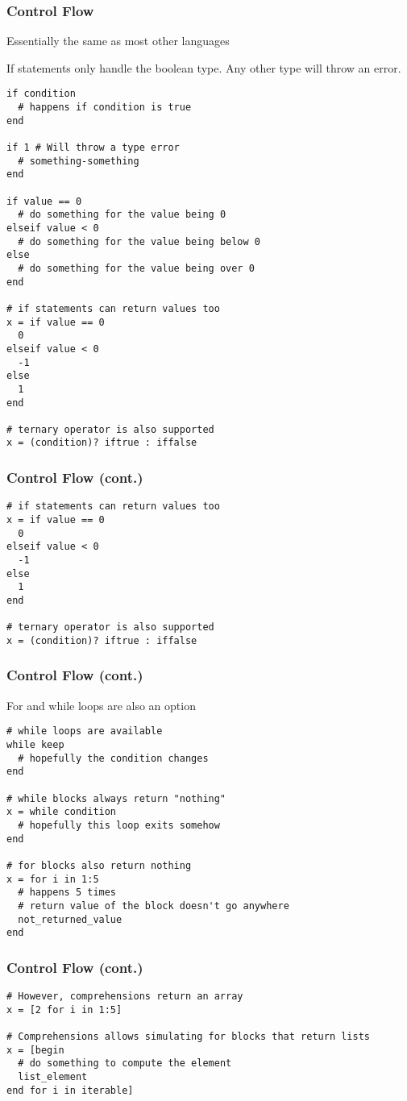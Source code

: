 \documentclass{beamer}
\begin{document}
\begin{frame}[fragile]
\frametitle{Control Flow}
Essentially the same as most other languages

If statements only handle the boolean type. Any other type will throw an error.
\begin{verbatim}
if condition
  # happens if condition is true
end

if 1 # Will throw a type error
  # something-something
end

if value == 0
  # do something for the value being 0
elseif value < 0
  # do something for the value being below 0
else
  # do something for the value being over 0
end

# if statements can return values too
x = if value == 0
  0
elseif value < 0
  -1
else
  1
end

# ternary operator is also supported
x = (condition)? iftrue : iffalse 
\end{verbatim}

\end{frame}

\begin{frame}[fragile]
\frametitle{Control Flow (cont.)}

\begin{verbatim}
# if statements can return values too
x = if value == 0
  0
elseif value < 0
  -1
else
  1
end

# ternary operator is also supported
x = (condition)? iftrue : iffalse 
\end{verbatim}
\end{frame}

\begin{frame}[fragile]
\frametitle{Control Flow (cont.)}

For and while loops are also an option

\begin{verbatim}
# while loops are available
while keep
  # hopefully the condition changes
end

# while blocks always return "nothing"
x = while condition
  # hopefully this loop exits somehow
end

# for blocks also return nothing
x = for i in 1:5
  # happens 5 times
  # return value of the block doesn't go anywhere
  not_returned_value
end
\end{verbatim}
\end{frame}

\begin{frame}[fragile]
\frametitle{Control Flow (cont.)}

\begin{verbatim}
# However, comprehensions return an array
x = [2 for i in 1:5]

# Comprehensions allows simulating for blocks that return lists
x = [begin
  # do something to compute the element
  list_element
end for i in iterable]
\end{verbatim}

\end{frame}
\end{document}
